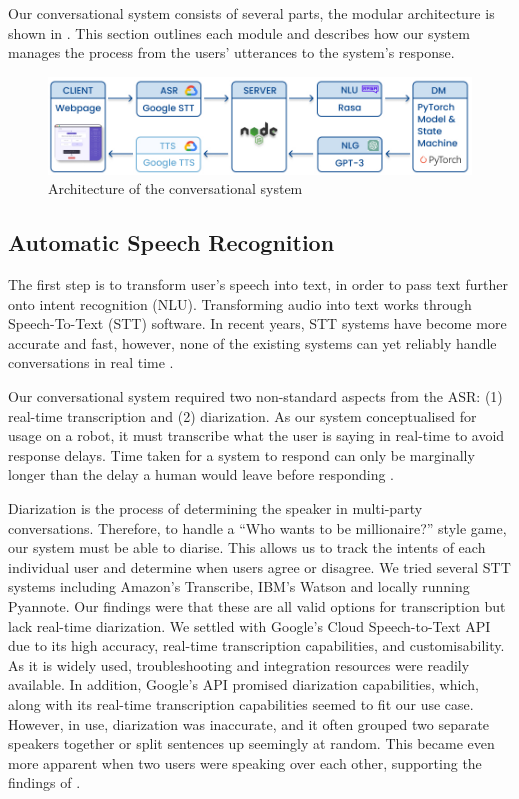 \documentclass[hidelinks, 11pt]{article}
\begin{document}
Our conversational system consists of several parts, the modular architecture is shown in . This section outlines each module and describes how our system manages the process from the users' utterances to the system's response.

\begin{figure}
  \includegraphics[width=\textwidth]{images/sys_graph.jpg}
  \caption{Architecture of the conversational system}
  \label{fig:system_architecture}
\end{figure}

\subsection{Automatic Speech Recognition}
\label{subsec:asr}

The first step is to transform user's speech into text, in order to pass text further onto intent recognition (NLU). Transforming audio into text works through Speech-To-Text (STT) software. In recent years, STT systems have become more accurate and fast, however, none of the existing systems can yet reliably handle conversations in real time \cite{addlesee_comprehensive_2020}.

Our conversational system required two non-standard aspects from the ASR: (1) real-time transcription and (2) diarization. As our system conceptualised for usage on a robot, it must transcribe what the user is saying in real-time to avoid response delays. Time taken for a system to respond can only be marginally longer than the delay a human would leave before responding .

Diarization is the process of determining the speaker in multi-party conversations. Therefore, to handle a ``Who wants to be millionaire?'' style game, our system must be able to diarise. This allows us to track the intents of each individual user and determine when users agree or disagree.
We tried several STT systems including Amazon's Transcribe, IBM's Watson and locally running Pyannote. Our findings were that these are all valid options for transcription but lack real-time diarization. We settled with Google's Cloud Speech-to-Text API due to its high accuracy, real-time transcription capabilities, and customisability. As it is widely used, troubleshooting and integration resources were readily available. In addition, Google's API promised diarization capabilities, which, along with its real-time transcription capabilities seemed to fit our use case. However, in use, diarization was inaccurate, and it often grouped two separate speakers together or split sentences up seemingly at random. This became even more apparent when two users were speaking over each other, supporting the findings of \cite{addlesee_comprehensive_2020}.
\end{document}
